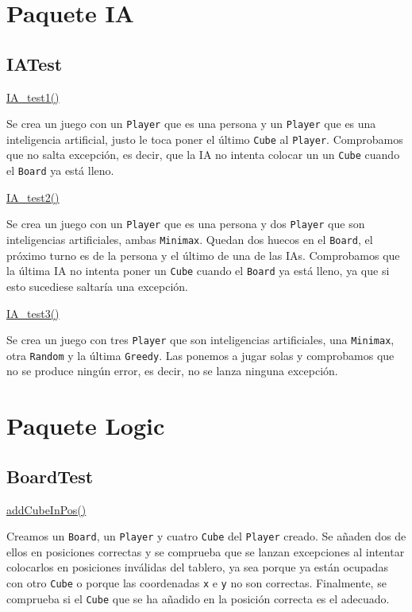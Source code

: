 \documentclass[../DocumentoOficial.tex]{subfiles}
\begin{document}
\section{Paquete IA}
\subsection{IATest}
\underline{IA\_test1()}

Se crea un juego con un \texttt{Player} que es una persona y un \texttt{Player} que es una inteligencia artificial, justo le toca poner el último \texttt{Cube} al \texttt{Player}. Comprobamos que no salta excepción, es decir, que la IA no intenta colocar un un \texttt{Cube} cuando el \texttt{Board} ya está lleno.

\underline{IA\_test2()}

Se crea un juego con un \texttt{Player} que es una persona y dos \texttt{Player} que son inteligencias artificiales, ambas \texttt{Minimax}. Quedan dos huecos en el \texttt{Board}, el próximo turno es de la persona y el último de una de las IAs. Comprobamos que la última IA no intenta poner un \texttt{Cube} cuando el \texttt{Board} ya está lleno, ya que si esto sucediese saltaría una excepción.

\underline{IA\_test3()}

Se crea un juego con tres \texttt{Player} que son inteligencias artificiales, una \texttt{Minimax}, otra \texttt{Random} y la última \texttt{Greedy}. Las ponemos a jugar solas y comprobamos que no se produce ningún error, es decir, no se lanza ninguna excepción.

\section{Paquete Logic}
\subsection{BoardTest}
\underline{addCubeInPos()}

Creamos un \texttt{Board}, un \texttt{Player} y cuatro \texttt{Cube} del \texttt{Player} creado. Se añaden dos de ellos en posiciones correctas y se comprueba que se lanzan excepciones al intentar colocarlos en posiciones inválidas del tablero, ya sea porque ya están ocupadas con otro \texttt{Cube} o porque las coordenadas \texttt{x} e \texttt{y} no son correctas. Finalmente, se comprueba si el \texttt{Cube} que se ha añadido en la posición correcta es el adecuado.
\end{document}

